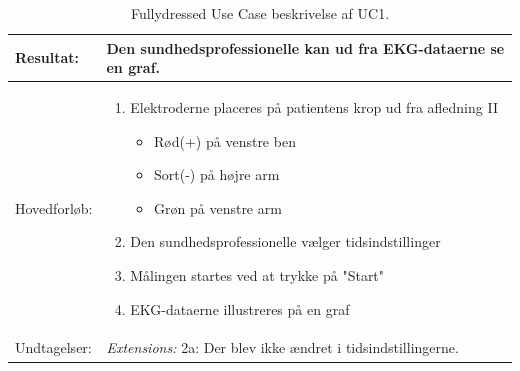 \begin{table}[H]
\begin{tabularx}{\textwidth}{l X}
     Resultat:              & 	Den sundhedsprofessionelle kan ud fra EKG-dataerne se en graf.                                                                                                                                                                                                                                                                                                                                                                                                                                                                                                                                                   \\ \midrule \addlinespace[1mm]                                                                                                                                                       
     Hovedforløb:           &  \begin{enumerate}
     						   \item Elektroderne placeres på patientens krop ud fra afledning II
     						   
     						   \begin{itemize}
     						   	\item Rød(+) på venstre ben 
     						   	\item Sort(-) på højre arm 
     						   	\item Grøn på venstre arm
     						   \end{itemize}

     						   \item Den sundhedsprofessionelle vælger tidsindstillinger
\newline						[Extension 2a: Den sundhedsprofessioneller er tilfreds med default-indstillingerne]
     						   \item Målingen startes ved at trykke på "Start"
		   				   	   \item EKG-dataerne illustreres på en graf
     						   \end{enumerate}
\\ \midrule 
 	Undtagelser:           & \textit{Extensions:}
\newline					 2a: Der blev ikke ændret i tidsindstillingerne. 
\\ \bottomrule
    \end{tabularx}
    \caption {Fullydressed Use Case beskrivelse af UC1.}
    \label{tab:UC1}
\end{table}





